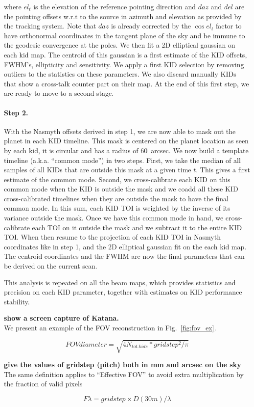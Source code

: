 where $el_t$ is the elevation of the reference pointing direction and $daz$ and
$del$ are the pointing offsets w.r.t to the source in azimuth and elevation as
provided by the tracking system. Note that $daz$ is already corrected by the
$\cos el_t$ factor to have orthonormal coordinates in the tangent plane of the sky
and be immune to the geodesic convergence at the poles. We then fit a 2D
elliptical gaussian on each kid map. The centroid of this gaussian is a first
estimate of the KID offsets, FWHM's, ellipticity and sensitivity. We apply a
first KID selection by removing outliers to the statistics on these
parameters. We also discard manually KIDs that show a cross-talk counter part on
their map. At the end of this first step, we are ready to move to a second
stage.

\paragraph{Step 2.} With the Nasmyth offsets derived in step 1, we are now able to
mask out the planet in each KID timeline. This mask is centered on the planet
location as seen by each kid, it is circular and has a radius of 60~arcsec. We
now build a template timeline (a.k.a. ``common mode'') in two steps. First, we
take the median of all samples of all KIDs that are outside this mask at a given
time $t$. This gives a first estimate of the common mode. Second, we
cross-calibrate each KID on this common mode when the KID is outside the mask
and we coadd all these KID cross-calibrated timelines when they are outside the
mask to have the final common mode. In this sum, each KID TOI is weighted by the
inverse of its variance outside the mask. Once we have this common mode in hand,
we cross-calibrate each TOI on it outside the mask and we subtract it to the
entire KID TOI. When then resume to the projection of each KID TOI in Nasmyth
coordinates like in step 1, and the 2D elliptical gaussian fit on the each kid
map. The centroid coordinates and the FWHM are now the final parameters that can
be derived on the current scan.

This analysis is repeated on all the beam maps, which provides statistics and
precision on each KID parameter, together with estimates on KID performance stability.

{\bf show a screen capture of Katana.}\\

We present an example of the FOV reconstruction in Fig.~\ref{fig:fov_ex}.

\begin{equation}
FOV diameter = \sqrt{4 N_{tot. kids} * gridstep^2/\pi}
\end{equation}

{\bf give the values of gridstep (pitch) both in mm and arcsec on the sky}\\

The same definition applies to ``Effective FOV'' to avoid extra multiplication
by the fraction of valid pixels

\begin{equation}
F\lambda = gridstep\times D(30m)/\lambda
\end{equation}
